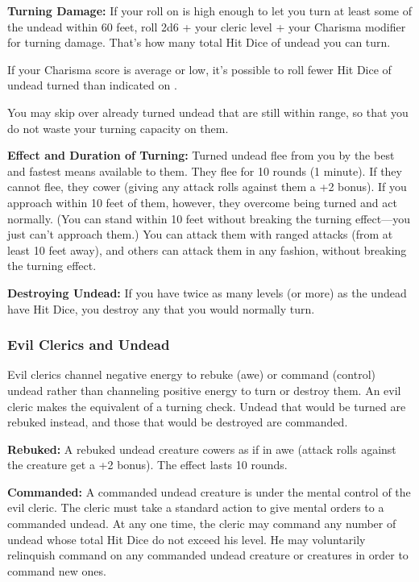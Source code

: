 \textbf{Turning Damage:} If your roll on  is high enough to let you turn at least some of the undead within 60 feet, roll 2d6 + your cleric level + your Charisma modifier for turning damage. That's how many total Hit Dice of undead you can turn.

If your Charisma score is average or low, it's possible to roll fewer Hit Dice of undead turned than indicated on .

You may skip over already turned undead that are still within range, so that you do not waste your turning capacity on them.

\textbf{Effect and Duration of Turning:} Turned undead flee from you by the best and fastest means available to them. They flee for 10 rounds (1 minute). If they cannot flee, they cower (giving any attack rolls against them a +2 bonus). If you approach within 10 feet of them, however, they overcome being turned and act normally. (You can stand within 10 feet without breaking the turning effect---you just can't approach them.) You can attack them with ranged attacks (from at least 10 feet away), and others can attack them in any fashion, without breaking the turning effect.

\textbf{Destroying Undead:} If you have twice as many levels (or more) as the undead have Hit Dice, you destroy any that you would normally turn.

\subsubsection{Evil Clerics and Undead}
Evil clerics channel negative energy to rebuke (awe) or command (control) undead rather than channeling positive energy to turn or destroy them. An evil cleric makes the equivalent of a turning check. Undead that would be turned are rebuked instead, and those that would be destroyed are commanded.

\textbf{Rebuked:} A rebuked undead creature cowers as if in awe (attack rolls against the creature get a +2 bonus). The effect lasts 10 rounds.

\textbf{Commanded:} A commanded undead creature is under the mental control of the evil cleric. The cleric must take a standard action to give mental orders to a commanded undead. At any one time, the cleric may command any number of undead whose total Hit Dice do not exceed his level. He may voluntarily relinquish command on any commanded undead creature or creatures in order to command new ones.

